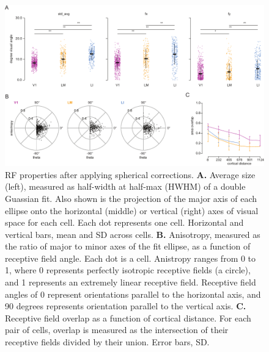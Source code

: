 \begin{figure}[hbt!]
\includegraphics[width=\textwidth]{figures/supplemental/fig_s10_spherical_correction_aggregate/fig_s10_spherical_correction_aggregate.pdf}
    \centering
    \caption[RF properties with spherical correction]{RF properties after applying spherical corrections. 
    \textbf{A.} Average size (left), measured as half-width at half-max (HWHM) of a double Guassian fit. Also shown is the projection of the major axis of each ellipse onto the horizontal (middle) or vertical (right) axes of visual space for each cell. Each dot represents one cell. Horizontal and vertical bars, mean and SD across cells. 
    \textbf{B.} Anisotropy, measured as the ratio of major to minor axes of the fit ellipse, as a function of receptive field angle. Each dot is a cell. Anistropy ranges from 0 to 1, where 0 represents perfectly isotropic receptive fields (a circle), and 1 represents an extremely linear receptive field. Receptive field angles of 0 represent orientations parallel to the horizontal axis, and 90 degrees represents orientation parallel to the vertical axis.
    \textbf{C.} Receptive field overlap as a function of cortical distance. For each pair of cells, overlap is measured as the intersection of their receptive fields divided by their union. Error bars, SD. 
    \label{supfig:spherical_correction_aggregate}}
\end{figure}



